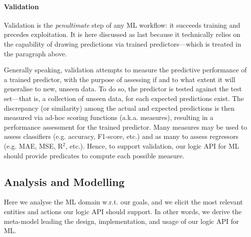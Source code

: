 \documentclass[12pt,a4paper,openright,twoside]{book}
\begin{document}
\paragraph{Validation}

Validation is the \emph{penultimate} step of any ML workflow: it succeeds training and precedes exploitation.
%
It is here discussed as last because it technically relies on the capability of drawing predictions via trained predictors---which is treated in the paragraph above.

Generally speaking, validation attempts to measure the predictive performance of a trained predictor, with the purpose of assessing if and to what extent it will generalise to new, unseen data.
%
To do so, the predictor is tested against the test set---that is, a collection of unseen data, for each expected predictions exist.
%
The discrepancy (or similarity) among the actual and expected predictions is then measured via ad-hoc scoring functions (a.k.a. measures), resulting in a performance assessment for the trained predictor.
%
Many measures may be used to assess classifiers (e.g. accuracy, F1-score, etc.) and as many to assess regressors (e.g. MAE, MSE, R$^2$, etc.).
%
Hence, to support validation, our logic API for ML should provide predicates to compute each possible measure.

\subsection{Analysis and Modelling}
\label{ssec:modelling}

Here we analyse the ML domain w.r.t. our goals, and we elicit the most relevant entities and actions our logic API should support.
%
In other words, we derive the meta-model leading the design, implementation, and usage of our logic API for ML.
\end{document}
